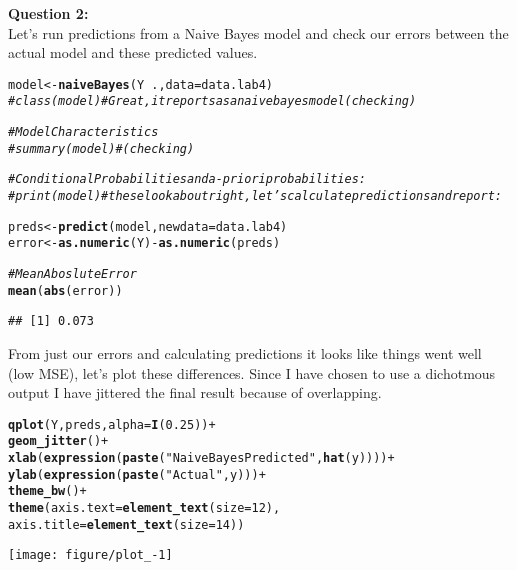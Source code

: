 \documentclass[12pt]{article}\usepackage[]{graphicx}\usepackage[]{color}
\makeatletter
\newcommand{\hlnum}[1]{\textcolor[rgb]{0.686,0.059,0.569}{#1}}%
\newcommand{\hlstr}[1]{\textcolor[rgb]{0.192,0.494,0.8}{#1}}%
\newcommand{\hlcom}[1]{\textcolor[rgb]{0.678,0.584,0.686}{\textit{#1}}}%
\newcommand{\hlopt}[1]{\textcolor[rgb]{0,0,0}{#1}}%
\newcommand{\hlstd}[1]{\textcolor[rgb]{0.345,0.345,0.345}{#1}}%
\newcommand{\hlkwb}[1]{\textcolor[rgb]{0.69,0.353,0.396}{#1}}%
\newcommand{\hlkwc}[1]{\textcolor[rgb]{0.333,0.667,0.333}{#1}}%
\newcommand{\hlkwd}[1]{\textcolor[rgb]{0.737,0.353,0.396}{\textbf{#1}}}%
\newenvironment{kframe}{%
 \def\at@end@of@kframe{}%
 \ifinner\ifhmode%
  \def\at@end@of@kframe{\end{minipage}}%
  \begin{minipage}{\columnwidth}%
 \fi\fi%
 \def\FrameCommand##1{\hskip\@totalleftmargin \hskip-\fboxsep
 \colorbox{shadecolor}{##1}\hskip-\fboxsep
     \hskip-\linewidth \hskip-\@totalleftmargin \hskip\columnwidth}%
 \MakeFramed {\advance\hsize-\width
   \@totalleftmargin\z@ \linewidth\hsize
   \@setminipage}}%
 {\par\unskip\endMakeFramed%
 \at@end@of@kframe}
\newenvironment{knitrout}{}{} %
\makeatother
\begin{document}
\begin{flushleft}
\textbf{Question 2:}\\
\hfill 
Let's run predictions from a Naive Bayes model and check our errors between the actual model and these predicted values.

\begin{knitrout}
\color{fgcolor}\begin{kframe}
\begin{alltt}
\hlstd{model} \hlkwb{<-} \hlkwd{naiveBayes}\hlstd{(Y} \hlopt{~} \hlstd{.,} \hlkwc{data} \hlstd{= data.lab4)}
\hlcom{# class(model) #Great, it reports as a naivebayes model (checking)}

\hlcom{#Model Characteristics}
\hlcom{# summary(model) #(checking)}

\hlcom{#Conditional Probabilities and a-priori probabilities:}
\hlcom{# print(model) #these look about right, let's calculate predictions and report:}

\hlstd{preds} \hlkwb{<-} \hlkwd{predict}\hlstd{(model,} \hlkwc{newdata} \hlstd{= data.lab4)}
\hlstd{error} \hlkwb{<-} \hlkwd{as.numeric}\hlstd{(Y)} \hlopt{-} \hlkwd{as.numeric}\hlstd{(preds)}

\hlcom{# Mean Aboslute Error}
\hlkwd{mean}\hlstd{(}\hlkwd{abs}\hlstd{(error))}
\end{alltt}
\begin{verbatim}
## [1] 0.073
\end{verbatim}
\end{kframe}
\end{knitrout}


From just our errors and calculating predictions it looks like things went well (low MSE), let's plot these differences. Since I have chosen to use a dichotmous output I have jittered the final result because of overlapping.

\begin{centering}
\begin{knitrout}
\color{fgcolor}\begin{kframe}
\begin{alltt}
\hlkwd{qplot}\hlstd{(Y, preds,} \hlkwc{alpha}\hlstd{=}\hlkwd{I}\hlstd{(}\hlnum{0.25}\hlstd{))}\hlopt{+}
  \hlkwd{geom_jitter}\hlstd{()}\hlopt{+}
  \hlkwd{xlab}\hlstd{(} \hlkwd{expression}\hlstd{(}\hlkwd{paste}\hlstd{(}\hlstr{"Naive Bayes Predicted "}\hlstd{,} \hlkwd{hat}\hlstd{(y))))}\hlopt{+}
  \hlkwd{ylab}\hlstd{(} \hlkwd{expression}\hlstd{(}\hlkwd{paste}\hlstd{(}\hlstr{"Actual "}\hlstd{, y)))}\hlopt{+}
  \hlkwd{theme_bw}\hlstd{()}\hlopt{+}
  \hlkwd{theme}\hlstd{(}\hlkwc{axis.text}\hlstd{=}\hlkwd{element_text}\hlstd{(}\hlkwc{size}\hlstd{=}\hlnum{12}\hlstd{),}
        \hlkwc{axis.title}\hlstd{=}\hlkwd{element_text}\hlstd{(}\hlkwc{size}\hlstd{=}\hlnum{14}\hlstd{))}
\end{alltt}
\end{kframe}
\texttt{[image: figure/plot\_-1]} 


\end{knitrout}
\end{centering}
\end{flushleft}
\end{document}
